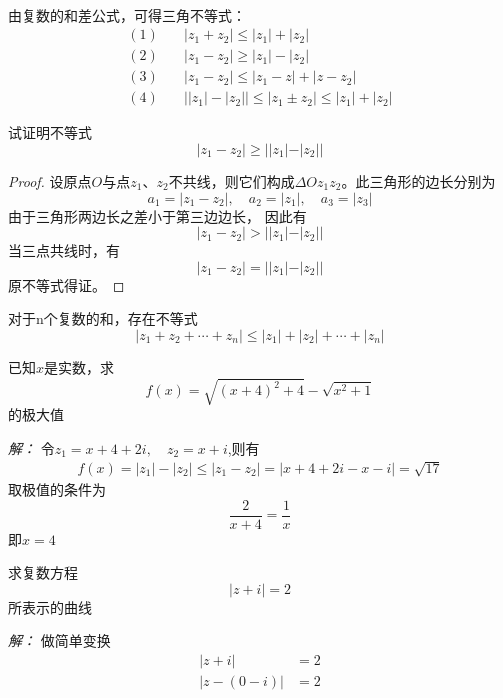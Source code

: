 ~\\
由复数的和差公式，可得三角不等式：
\begin{equation}\label{}
    \begin{aligned}
        (1) &\quad   \left\vert z_1 + z_2 \right\vert \le \left\vert z_1 \right\vert +
        \left\vert z_2 \right\vert \\
        (2) &\quad  |z_1-z_2| \ge |z_1|  - |z_2|  \\
     (3) & \quad  |z_1-z_2| \le |z_1- z|  + |z-z_2|  \\ 
     (4) & \quad \left\vert \left\vert z_1\right\vert - \left\vert z_2\right\vert \right\vert  \le \left\vert z_1 \pm z_2 \right\vert 
     \le \left\vert z_1\right\vert + \left\vert z_2 \right\vert 
\end{aligned} 
\end{equation}
\begin{example}
    试证明不等式
    \[|z_1 -z_2| \ge ||z_1| - |z_2||\]
    \end{example}
\begin{proof}
    设原点$O$与点$z_1$、$z_2$不共线，则它们构成$\Delta Oz_1z_2$。此三角形的边长分别为
    $$a_1 =|z_1 -z_2|, \quad a_2 =|z_1|, \quad a_3 =|z_3|$$
    由于三角形两边长之差小于第三边边长， 因此有 
    \[|z_1 -z_2| > ||z_1| - |z_2||\]
    当三点共线时，有 
    \[|z_1 -z_2| = ||z_1| - |z_2||\]
    原不等式得证。
\end{proof}
\begin{corollary}\label{}
    \noindent 对于n个复数的和，存在不等式
    \begin{equation}
        |z_1 + z_2 + \cdots + z_n| \le |z_1| + |z_2| + \cdots +   |z_n| 
    \end{equation}
\end{corollary}
\begin{example}
    已知$x$是实数，求 
    \[f(x) = \sqrt{(x+4)^2 +4} - \sqrt{x^2 +1}\]
    的极大值
\end{example}
    \emph{解：} 令$z_1 = x+4 + 2i, \quad z_2 = x+i$,则有 
    \[ \begin{aligned}
        f(x) = |z_1| - |z_2| 
          \le |z_1-z_2| 
          = |x+4 + 2i - x -i| 
          = \sqrt{17}
    \end{aligned} \]
    取极值的条件为
    \[ \frac{2}{x+4} = \frac{1}{x}\]
    即$x=4$
\begin{example}
    求复数方程 
    \[\left\vert z+i\right\vert =2\]
    所表示的曲线 
    \end{example}
    \emph{解：} 做简单变换
    \[ \begin{aligned}
       \left\vert z+i\right\vert &=2  \\ 
       \left\vert z- (0-i)\right\vert &=2  \\ 
    \end{aligned} \]
